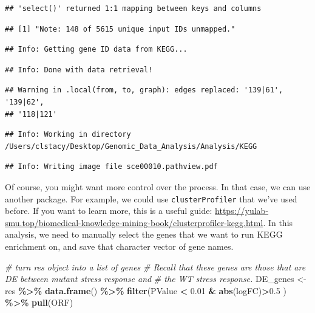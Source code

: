 \documentclass[
]{book}
\newenvironment{Shaded}{\begin{snugshade}}{\end{snugshade}}
\newcommand{\CommentTok}[1]{\textcolor[rgb]{0.56,0.35,0.01}{\textit{#1}}}
\newcommand{\FloatTok}[1]{\textcolor[rgb]{0.00,0.00,0.81}{#1}}
\newcommand{\FunctionTok}[1]{\textcolor[rgb]{0.13,0.29,0.53}{\textbf{#1}}}
\newcommand{\NormalTok}[1]{#1}
\newcommand{\OtherTok}[1]{\textcolor[rgb]{0.56,0.35,0.01}{#1}}
\newcommand{\SpecialCharTok}[1]{\textcolor[rgb]{0.81,0.36,0.00}{\textbf{#1}}}
\begin{document}
\begin{verbatim}
## 'select()' returned 1:1 mapping between keys and columns
\end{verbatim}

\begin{verbatim}
## [1] "Note: 148 of 5615 unique input IDs unmapped."
\end{verbatim}

\begin{verbatim}
## Info: Getting gene ID data from KEGG...
\end{verbatim}

\begin{verbatim}
## Info: Done with data retrieval!
\end{verbatim}

\begin{verbatim}
## Warning in .local(from, to, graph): edges replaced: '139|61', '139|62',
## '118|121'
\end{verbatim}

\begin{verbatim}
## Info: Working in directory /Users/clstacy/Desktop/Genomic_Data_Analysis/Analysis/KEGG
\end{verbatim}

\begin{verbatim}
## Info: Writing image file sce00010.pathview.pdf
\end{verbatim}

Of course, you might want more control over the process. In that case, we can use another package. For example, we could use \texttt{clusterProfiler} that we've used before. If you want to learn more, this is a useful guide: \url{https://yulab-smu.top/biomedical-knowledge-mining-book/clusterprofiler-kegg.html}. In this analysis, we need to manually select the genes that we want to run KEGG enrichment on, and save that character vector of gene names.

\begin{Shaded}
\begin{Highlighting}[]
\CommentTok{\# turn res object into a list of genes}
\CommentTok{\# Recall that these genes are those that are DE between mutant stress response and}
\CommentTok{\# the WT stress response.}
\NormalTok{DE\_genes }\OtherTok{\textless{}{-}}\NormalTok{ res }\SpecialCharTok{\%\textgreater{}\%} 
  \FunctionTok{data.frame}\NormalTok{() }\SpecialCharTok{\%\textgreater{}\%}
  \FunctionTok{filter}\NormalTok{(PValue }\SpecialCharTok{\textless{}} \FloatTok{0.01} \SpecialCharTok{\&} \FunctionTok{abs}\NormalTok{(logFC)}\SpecialCharTok{\textgreater{}}\FloatTok{0.5}
\NormalTok{         ) }\SpecialCharTok{\%\textgreater{}\%}
  \FunctionTok{pull}\NormalTok{(ORF)}
\end{Highlighting}
\end{Shaded}
\end{document}
